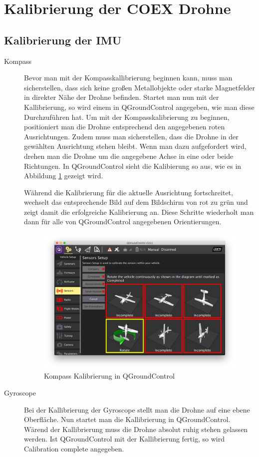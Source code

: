 \section{Kalibrierung der COEX Drohne} \label{kalibrierung_coex__drohne:subsection}
\subsection{Kalibrierung der IMU}
\begin{description}
    \item[Kompass] Bevor man mit der Kompasskallibrierung beginnen kann, muss man sicherstellen, dass sich keine großen Metallobjekte oder starke Magnetfelder in direkter Nähe der Drohne befinden. Startet man nun mit der Kallibrierung, so wird einem in QGroundControl angegeben, wie man diese Durchzuführen hat. Um mit der Kompasskalibrierung zu beginnen, positioniert man die Drohne entsprechend den angegebenen roten Ausrichtungen. Zudem muss man sicherstellen, dass die Drohne in der gewählten Ausrichtung stehen bleibt. Wenn man dazu aufgefordert wird, drehen man die Drohne um die angegebene Achse in eine oder beide Richtungen. In QGroundControl sieht die Kalibierung so aus, wie es in Abbildung \ref{fig:compass-calibration} gezeigt wird.

    Während die Kalibrierung für die aktuelle Ausrichtung fortschreitet, wechselt das entsprechende Bild auf dem Bildschirm von rot zu grün und zeigt damit die erfolgreiche Kalibrierung an. Diese Schritte wiederholt man dann für alle von QGroundControl angegebenen Orientierungen.
    \begin{figure}[h]
        \includegraphics[width=\textwidth]{./images/qgc-cal-compass.png}
        \caption{Kompass Kalibrierung in QGroundControl}\label{fig:compass-calibration}
    \end{figure}
    \item[Gyroscope] Bei der Kallibrierung der Gyroscope stellt man die Drohne auf eine ebene Oberfläche. Nun startet man die Kallibrierung in QGroundControl. Wärend der Kallibrierung muss die Drohne absolut ruhig stehen gelassen werden. Ist QGroundControl mit der Kallibrierung fertig, so wird Calibration complete angegeben.
    

\end{description}

